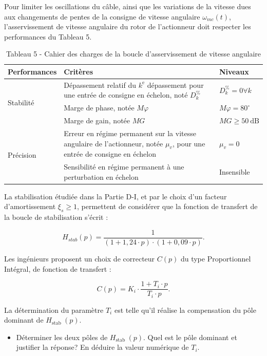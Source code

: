\documentclass[10pt]{article}
\begin{document}
Pour limiter les oscillations du câble, ainsi que les variations de la vitesse dues aux changements de pentes de la consigne de vitesse angulaire $\omega_{m c}(t)$, l'asservissement de vitesse angulaire du rotor de l'actionneur doit respecter les performances du Tableau 5.

\begin{table}[h]
\begin{center}
\begin{tabular}[t]{|l|l|l|}
\hline
Performances & Critères & Niveaux \\
\hline
\multirow[t]{3}{*}{Stabilité} & Dépassement relatif du $k^{\mathrm{e}}$ dépassement pour une entrée de consigne en échelon, noté $D_{k}^{\%}$ & $D_{k}^{\%}=0 \forall k$ \\
\hline
 & Marge de phase, notée $M \varphi$ & $M \varphi=80^{\circ}$ \\
\hline
 & Marge de gain, notée $M G$ & $M G \geqslant 50 \mathrm{~dB}$ \\
\hline
\multirow[t]{2}{*}{Précision} & Erreur en régime permanent sur la vitesse angulaire de l'actionneur, notée $\mu_{v}$, pour une entrée de consigne en échelon & $\mu_{v}=0$ \\
\hline
 & Sensibilité en régime permanent à une perturbation en échelon & Insensible \\
\hline
\end{tabular}
\captionsetup{labelformat=empty}
\caption{Tableau 5 - Cahier des charges de la boucle d'asservissement de vitesse angulaire}
\end{center}
\end{table}

La stabilisation étudiée dans la Partie D-I, et par le choix d'un facteur d'amortissement $\xi_{s} \geqslant 1$, permettent de considérer que la fonction de transfert de la boucle de stabilisation s'écrit :

$$
H_{s t a b}(p)=\frac{1}{(1+1,24 \cdot p) \cdot(1+0,09 \cdot p)} .
$$

Les ingénieurs proposent un choix de correcteur $C(p)$ du type Proportionnel Intégral, de fonction de transfert :

$$
C(p)=K_{i} \cdot \frac{1+T_{i} \cdot p}{T_{i} \cdot p} .
$$

La détermination du paramètre $T_{i}$ est telle qu'il réalise la compensation du pôle dominant de $H_{\text {stab }}(p)$.

\begin{itemize}
  \item[Q26.] Déterminer les deux pôles de $H_{\text {stab }}(p)$. Quel est le pôle dominant et justifier la réponse? En déduire la valeur numérique de $T_{i}$.
\end{itemize}
\end{document}
